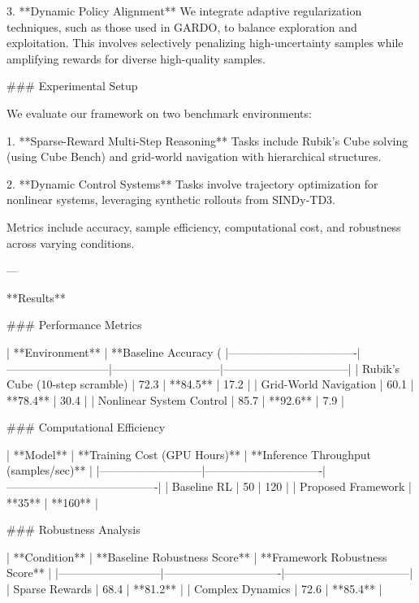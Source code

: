 3. **Dynamic Policy Alignment**  
   We integrate adaptive regularization techniques, such as those used in GARDO, to balance exploration and exploitation. This involves selectively penalizing high-uncertainty samples while amplifying rewards for diverse high-quality samples.

### Experimental Setup

We evaluate our framework on two benchmark environments:

1. **Sparse-Reward Multi-Step Reasoning**  
   Tasks include Rubik’s Cube solving (using Cube Bench) and grid-world navigation with hierarchical structures.

2. **Dynamic Control Systems**  
   Tasks involve trajectory optimization for nonlinear systems, leveraging synthetic rollouts from SINDy-TD3.

Metrics include accuracy, sample efficiency, computational cost, and robustness across varying conditions.

---

**Results**

### Performance Metrics

| **Environment**                 | **Baseline Accuracy (%
|----------------------------------|---------------------------|-----------------------------|---------------------------------|  
| Rubik's Cube (10-step scramble)  | 72.3                      | **84.5**                   | 17.2                           |  
| Grid-World Navigation            | 60.1                      | **78.4**                   | 30.4                           |  
| Nonlinear System Control         | 85.7                      | **92.6**                   | 7.9                            |  

### Computational Efficiency

| **Model**                 | **Training Cost (GPU Hours)** | **Inference Throughput (samples/sec)** |  
|---------------------------|-------------------------------|----------------------------------------|  
| Baseline RL               | 50                            | 120                                    |  
| Proposed Framework        | **35**                        | **160**                                |  

### Robustness Analysis

| **Condition**             | **Baseline Robustness Score** | **Framework Robustness Score** |  
|---------------------------|-------------------------------|---------------------------------|  
| Sparse Rewards            | 68.4                          | **81.2**                       |  
| Complex Dynamics          | 72.6                          | **85.4**                       |  


